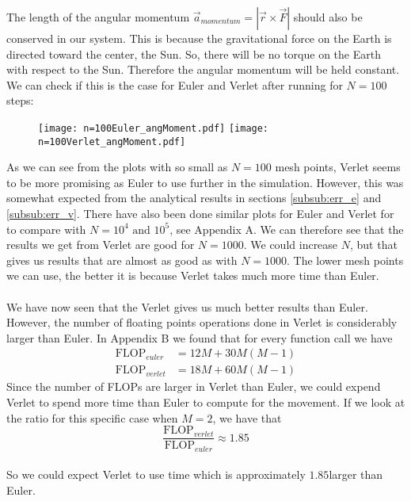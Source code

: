 \documentclass[12pt]{article}
\begin{document}
	The length of the angular momentum $\vec{a}_{momentum} =  |\vec{r} \times \vec{F}| $ should also be conserved in our system. This is because the gravitational force on the Earth is directed toward the center, the Sun. So, there will be no torque on the Earth with respect to the Sun. Therefore the angular momentum will be held constant. We can check if this is the case for Euler and Verlet after running for $N = 100$ steps: 
	\begin{figure}[h]
		\texttt{[image: n=100Euler\_angMoment.pdf]}
		\texttt{[image: n=100Verlet\_angMoment.pdf]}
	\end{figure}
		As we can see from the plots with so small as $N=100$ mesh points, Verlet seems to be more promising as Euler to use further in the simulation. However, this was somewhat expected from the analytical results in sections \ref{subsub:err_e} and \ref{subsub:err_v}. There have also been done similar plots for Euler and Verlet for to compare with $N = 10^4 \text{ and } 10^5$, see Appendix A. We can therefore see that the results we get from Verlet are good for $N = 1000$. We could increase $N$, but that gives us results that are almost as good as with $N= 1000$. The lower mesh points we can use, the better it is because Verlet takes much more time than Euler.
		\\ \\We have now seen that the Verlet gives us much better results than Euler. However, the number of floating points operations done in Verlet is considerably larger than Euler. In Appendix B we found that for every function call we have
		\begin{align*}
			\text{FLOP}_{euler} &=  12M + 30M(M-1) \\
			\text{FLOP}_{verlet} &= 18M + 60M(M-1)
		\end{align*}
		  Since the number of FLOPs are larger in Verlet than Euler, we could expend Verlet to spend more time than Euler to compute for the movement. If we look at the ratio for this specific case when $M = 2$, we have that
		  \begin{equation*}
		  	\dfrac{\text{FLOP}_{verlet}}{\text{FLOP}_{euler} } \approx 1.85
		  \end{equation*}\\
		  So we could expect Verlet to use time which is approximately $1.85$larger than Euler. 
\end{document}
